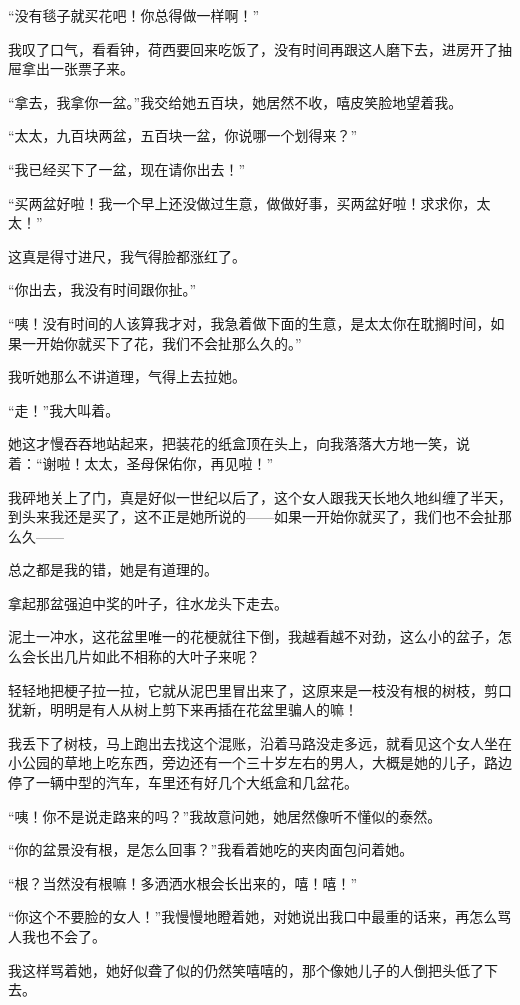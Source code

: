 \par “没有毯子就买花吧！你总得做一样啊！”
\par 我叹了口气，看看钟，荷西要回来吃饭了，没有时间再跟这人磨下去，进房开了抽屉拿出一张票子来。
\par “拿去，我拿你一盆。”我交给她五百块，她居然不收，嘻皮笑脸地望着我。
\par “太太，九百块两盆，五百块一盆，你说哪一个划得来？”
\par “我已经买下了一盆，现在请你出去！”
\par “买两盆好啦！我一个早上还没做过生意，做做好事，买两盆好啦！求求你，太太！”
\par 这真是得寸进尺，我气得脸都涨红了。
\par “你出去，我没有时间跟你扯。”
\par “咦！没有时间的人该算我才对，我急着做下面的生意，是太太你在耽搁时间，如果一开始你就买下了花，我们不会扯那么久的。”
\par 我听她那么不讲道理，气得上去拉她。
\par “走！”我大叫着。
\par 她这才慢吞吞地站起来，把装花的纸盒顶在头上，向我落落大方地一笑，说着：“谢啦！太太，圣母保佑你，再见啦！”
\par 我砰地关上了门，真是好似一世纪以后了，这个女人跟我天长地久地纠缠了半天，到头来我还是买了，这不正是她所说的——如果一开始你就买了，我们也不会扯那么久——
\par 总之都是我的错，她是有道理的。
\par 拿起那盆强迫中奖的叶子，往水龙头下走去。
\par 泥土一冲水，这花盆里唯一的花梗就往下倒，我越看越不对劲，这么小的盆子，怎么会长出几片如此不相称的大叶子来呢？
\par 轻轻地把梗子拉一拉，它就从泥巴里冒出来了，这原来是一枝没有根的树枝，剪口犹新，明明是有人从树上剪下来再插在花盆里骗人的嘛！
\par 我丢下了树枝，马上跑出去找这个混账，沿着马路没走多远，就看见这个女人坐在小公园的草地上吃东西，旁边还有一个三十岁左右的男人，大概是她的儿子，路边停了一辆中型的汽车，车里还有好几个大纸盒和几盆花。
\par “咦！你不是说走路来的吗？”我故意问她，她居然像听不懂似的泰然。
\par “你的盆景没有根，是怎么回事？”我看着她吃的夹肉面包问着她。
\par “根？当然没有根嘛！多洒洒水根会长出来的，嘻！嘻！”
\par “你这个不要脸的女人！”我慢慢地瞪着她，对她说出我口中最重的话来，再怎么骂人我也不会了。
\par 我这样骂着她，她好似聋了似的仍然笑嘻嘻的，那个像她儿子的人倒把头低了下去。
